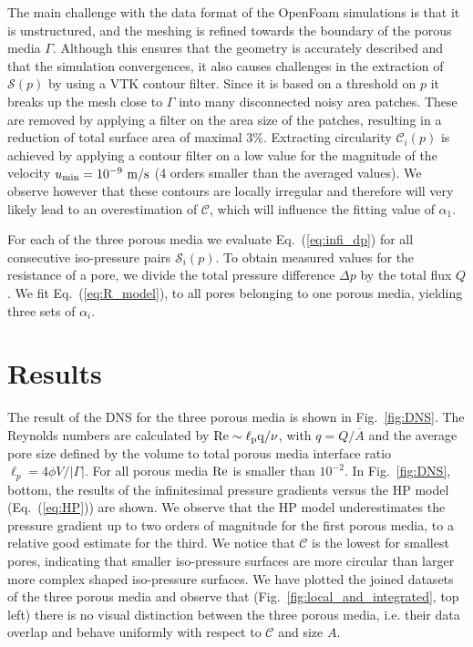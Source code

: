\documentclass[draft]{agujournal2019}
\begin{document}
The main challenge with the data format of the OpenFoam simulations is that it is unstructured, and the meshing is refined towards the boundary of the porous media $\Gamma$. Although this ensures that the geometry is accurately described and that the simulation convergences, it also causes challenges in the extraction of $\mathcal{S}(p)$ by using a VTK contour filter. Since it is based on a threshold on $p$ it breaks up the mesh close to $\Gamma$ into many disconnected noisy area patches. These are removed by applying a filter on the area size of the patches, resulting in a reduction of total surface area of maximal $3\%$. Extracting circularity $\mathcal{C}_i(p)$ is achieved by applying a contour filter on a low value for the magnitude of the velocity $u_{\rm{min}} = 10^{-9}~\rm{m/s}$ (4 orders smaller than the averaged values). We observe however that these contours are locally irregular and therefore will very likely lead to an overestimation of $\mathcal{C}$, which will influence the fitting value of $\alpha_1$. 

For each of the three porous media we evaluate Eq.~(\ref{eq:infi_dp}) for all consecutive iso-pressure pairs $\mathcal{S}_i(p)$. To obtain measured values for the resistance of a pore, we divide the total pressure difference $\Delta p$ by the total flux $Q$. We fit Eq.~(\ref{eq:R_model}), to all pores belonging to one porous media, yielding three sets of $\alpha_i$.  


\section{Results}


The result of the DNS for the three porous media is shown in Fig.~\ref{fig:DNS}. The Reynolds numbers are calculated by $\rm{Re} \sim \ell_p q/\nu$, with $q = Q/\overline{A}$ and the average pore size defined by the volume to total porous media interface ratio $\ell_p = 4 \phi V/|\Gamma|$. For all porous media $\rm{Re}$ is smaller than $10^{-2}$. In Fig.~\ref{fig:DNS}, bottom, the results of the infinitesimal pressure gradients versus the HP model (Eq.~(\ref{eq:HP})) are shown. We observe that the HP model underestimates the pressure gradient up to two orders of magnitude for the first porous media, to a relative good estimate for the third. We notice that $\mathcal{C}$ is the lowest for smallest pores, indicating that smaller iso-pressure surfaces are more circular than larger more complex shaped iso-pressure surfaces. We have plotted the joined datasets of the three porous media and observe that (Fig.~\ref{fig:local_and_integrated}, top left) there is no visual distinction between the three porous media, i.e. their data overlap and behave uniformly with respect to $\mathcal{C}$ and size $A$.
 
\end{document}
